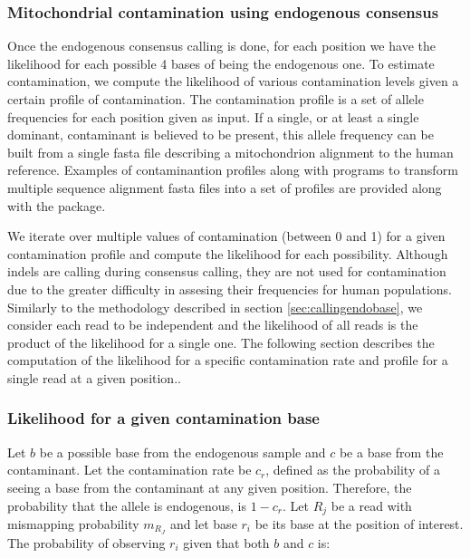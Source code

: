 \documentclass[a4paper,12pt]{article}
\begin{document}
\begin{itemize}
\begin{itemize}
\subsubsection{Mitochondrial contamination using endogenous consensus}

\label{sec:contestondb}


Once the endogenous consensus calling is done, for each position we have the likelihood for each possible 4 bases of being the endogenous one. To estimate contamination, we compute the likelihood of various contamination levels given a certain profile of contamination. The contamination profile is a set of allele frequencies for each position given as input. If a single, or at least a single dominant, contaminant is believed to be present, this allele frequency can be built from a single fasta file describing a mitochondrion alignment to the human reference.  Examples of contaminantion profiles along with programs to transform multiple sequence alignment fasta files into a set of profiles are provided along with the package. 

We iterate over multiple values of contamination (between 0 and 1) for a given contamination profile and compute the likelihood for each possibility. Although indels are calling during consensus calling, they are not used for contamination due to the greater difficulty in assesing their frequencies for human populations. Similarly to the methodology described in section \ref{sec:callingendobase}, we consider each read to be independent and the likelihood of all reads is the product of the likelihood for a single one. The following section describes the computation of the likelihood for a specific contamination rate and profile for a single read at a given position.. 


\subsubsection{Likelihood for a given contamination base}

Let $b$ be a possible base from the endogenous sample and $c$ be a base from the contaminant. Let the contamination rate be $c_r$, defined as the probability of a seeing a base from the contaminant at any given position. Therefore, the probability that the allele is endogenous, is $1-c_r$. Let $R_j$ be a read with mismapping probability $m_{R_J}$ and let base $r_i$ be its base at the position of interest. The probability of observing $r_i$ given that both $b$ and $c$ is:


\end{itemize}
\end{itemize}
\end{document}

